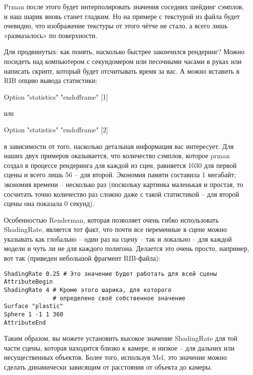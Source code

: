  Prman после этого будет интерполировать значения
    соседних шейдинг сэмплов, и наш шарик вновь станет гладким. Но на
    примере с текстурой из файла будет очевидно, что изображение
    текстуры от этого чётче не стало, а всего лишь «размазалось» по
    поверхности.
  

 Для
    продвинутых: как понять, насколько
    быстрее закончился рендеринг? Можно посидеть над компьютером с
    секундомером или песочными часами в руках или написать скрипт,
    который будет отсчитывать время за вас. А можно вставить в RIB
    опцию вывода статистики:
  

Option "statistics"
    "endofframe"
    [1]
  

 {\it или}
  

Option "statistics"
    "endofframe"
    [2]
  

 в зависимости
    от того, насколько детальная информация вас интересует. Для наших
    двух примеров оказывается, что количество сэмплов, которое prman
    создал в процессе рендеринга для каждой из сцен, равняется 1030 для
    первой сцены и всего лишь 56 – для второй. Экономия памяти
    составила 1 мегабайт; экономия времени – несколько раз (поскольку
    картинка маленькая и простая, то сосчитать точно количество раз
    сложно даже с такой статистикой – для второй сцены она показала 0
    секунд).
  

 Особенностью Renderman, которая позволяет очень
    гибко использовать ShadingRate, является тот факт, что почти все
    переменные в сцене можно указывать как глобально – один раз на
    сцену – так и локально – для каждой модели и чуть ли не для каждого
    полигона. Делается это очень просто, например, вот так (приведен
    небольшой фрагмент RIB-файла):
  
\begin{lstlisting}[frame=single, framerule=0pt, framesep=10pt, xleftmargin=10pt, xrightmargin=10pt]
ShadingRate 0.25 # Это значение будет работать для всей сцены
AttributeBegin
ShadingRate 4 # Кроме этого шарика, для которого
              # определено своё собственное значение
Surface "plastic"
Sphere 1 -1 1 360
AttributeEnd
\end{lstlisting}
  

 Таким образом, вы можете установить высокое
    значение ShadingRate для той части сцены, которая находится близко
    к камере, и низкое – для дальних или несущественных объектов. Более
    того, используя Mel, это значение можно сделать динамически
    зависящим от расстояния от объекта до камеры.
  

